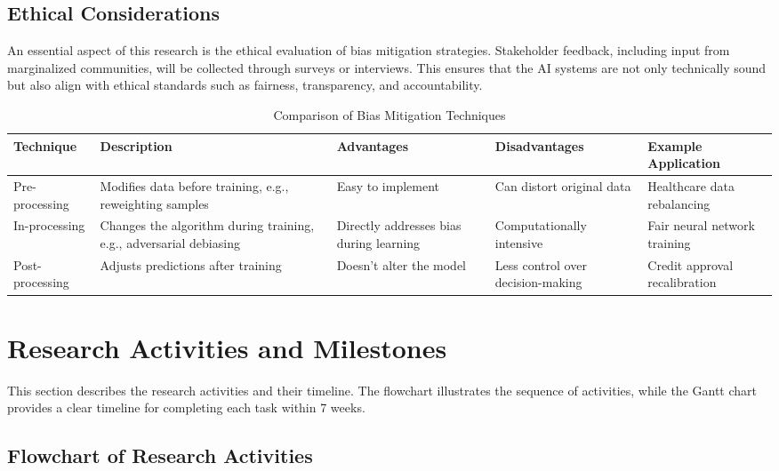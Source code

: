 \documentclass[a4paper, 12pt]{article}
\begin{document}
\subsection{Ethical Considerations}
An essential aspect of this research is the ethical evaluation of bias mitigation strategies. Stakeholder feedback, including input from marginalized communities, will be collected through surveys or interviews. This ensures that the AI systems are not only technically sound but also align with ethical standards such as fairness, transparency, and accountability.

\begin{table}[h]
    \centering
    \caption{Comparison of Bias Mitigation Techniques}
    \begin{tabular}{|l|p{4cm}|p{3cm}|p{3cm}|p{3cm}|}
        \hline
        \textbf{Technique} & \textbf{Description} & \textbf{Advantages} & \textbf{Disadvantages} & \textbf{Example Application} \\
        \hline
        Pre-processing & Modifies data before training, e.g., reweighting samples & Easy to implement & Can distort original data & Healthcare data rebalancing \\
        \hline
        In-processing & Changes the algorithm during training, e.g., adversarial debiasing & Directly addresses bias during learning & Computationally intensive & Fair neural network training \\
        \hline
        Post-processing & Adjusts predictions after training & Doesn’t alter the model & Less control over decision-making & Credit approval recalibration \\
        \hline
    \end{tabular}
    \label{table:mitigation_techniques}
\end{table}

\section{Research Activities and Milestones}

This section describes the research activities and their timeline. The flowchart illustrates the sequence of activities, while the Gantt chart provides a clear timeline for completing each task within 7 weeks.

\subsection*{Flowchart of Research Activities}
\end{document}
